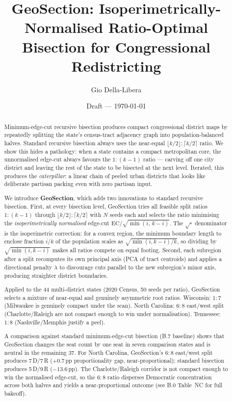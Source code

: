 \documentclass[12pt]{article}
\title{GeoSection: Isoperimetrically-Normalised Ratio-Optimal\\
       Bisection for Congressional Redistricting}
\author{Gio Della-Libera}
\date{Draft --- \today}
\begin{document}
\maketitle

\begin{abstract}
Minimum-edge-cut recursive bisection produces compact congressional district maps
by repeatedly splitting the state's census-tract adjacency graph into
population-balanced halves.
Standard recursive bisection always uses the near-equal $\lfloor k/2\rfloor:\lceil k/2\rceil$ ratio.
We show this hides a pathology: when a state contains a compact metropolitan
core, the unnormalised edge-cut always favours the $1:(k-1)$ ratio
--- carving off one city district and leaving the rest of the state
to be bisected at the next level.
Iterated, this produces the \emph{caterpillar}: a linear chain of peeled
urban districts that looks like deliberate partisan packing even with
zero partisan input.

We introduce \textbf{GeoSection}, which adds two innovations to standard
recursive bisection.
First, at every bisection level, GeoSection tries all feasible split ratios
$1:(k-1)$ through $\lfloor k/2\rfloor:\lceil k/2\rceil$ with $N$ seeds each
and selects the ratio minimising the \emph{isoperimetrically normalised}
edge-cut $\mathrm{EC}/\sqrt{\min(i,\,k-i)}$.
The $\sqrt{\cdot}$ denominator is the isoperimetric correction: for a convex region,
the minimum boundary length to enclose fraction $i/k$ of the population
scales as $\sqrt{\min(i,k-i)/k}$, so dividing by $\sqrt{\min(i,k-i)}$
makes all ratios compete on equal footing.
Second, each subregion after a split recomputes its own principal axis
(PCA of tract centroids) and applies a directional penalty $\lambda$
to discourage cuts parallel to the new subregion's minor axis,
producing straighter district boundaries.

Applied to the 44 multi-district states (2020 Census, 50 seeds per ratio),
GeoSection selects a mixture of near-equal and genuinely asymmetric root
ratios.
Wisconsin: $1:7$ (Milwaukee is genuinely compact under the scan).
North Carolina: $6:8$ east/west split (Charlotte/Raleigh are not
compact enough to win under normalisation).
Tennessee: $1:8$ (Nashville/Memphis justify a peel).

A comparison against standard minimum-edge-cut bisection (B.7 baseline)
shows that GeoSection changes the seat count by one seat in seven comparison
states and is neutral in the remaining 37.
For North Carolina, GeoSection's $6:8$ east/west split produces 7\,D/7\,R
($+0.7$\,pp proportionality gap, near-proportional); standard bisection
produces 5\,D/9\,R ($-13.6$\,pp).
The Charlotte/Raleigh corridor is not compact enough to win the normalised
edge-cut, so the $6:8$ ratio disperses Democratic concentration across both
halves and yields a near-proportional outcome (see B.0 Table~NC for full
bakeoff).
\end{abstract}










\end{document}
